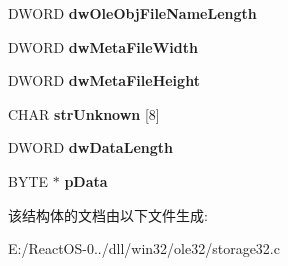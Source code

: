 \begin{DoxyCompactItemize}
D\+W\+O\+RD {\bfseries dw\+Ole\+Obj\+File\+Name\+Length}
\item 
\mbox{\label{struct_o_l_e_c_o_n_v_e_r_t___o_l_e_s_t_r_e_a_m___d_a_t_a_a4250352fc339e3a44cd0f173576fcd05}} 
D\+W\+O\+RD {\bfseries dw\+Meta\+File\+Width}
\item 
\mbox{\label{struct_o_l_e_c_o_n_v_e_r_t___o_l_e_s_t_r_e_a_m___d_a_t_a_aadc36fb83e1cf5a8c77852df91bd3718}} 
D\+W\+O\+RD {\bfseries dw\+Meta\+File\+Height}
\item 
\mbox{\label{struct_o_l_e_c_o_n_v_e_r_t___o_l_e_s_t_r_e_a_m___d_a_t_a_a74b9973ab6ab0f66a62a49fcf915c080}} 
C\+H\+AR {\bfseries str\+Unknown} \mbox{[}8\mbox{]}
\item 
\mbox{\label{struct_o_l_e_c_o_n_v_e_r_t___o_l_e_s_t_r_e_a_m___d_a_t_a_abf329df5f645ec9d648594c69bf62824}} 
D\+W\+O\+RD {\bfseries dw\+Data\+Length}
\item 
\mbox{\label{struct_o_l_e_c_o_n_v_e_r_t___o_l_e_s_t_r_e_a_m___d_a_t_a_a537117c1a3ae2250c6e8bc480bce4ffa}} 
B\+Y\+TE $\ast$ {\bfseries p\+Data}
\end{DoxyCompactItemize}


该结构体的文档由以下文件生成\+:\begin{DoxyCompactItemize}
\item 
E\+:/\+React\+O\+S-\/0../dll/win32/ole32/storage32.\+c\end{DoxyCompactItemize}
